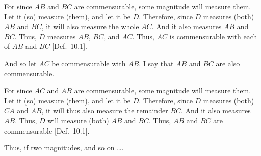 \begin{Parallel}{}{}
{For since $AB$ and $BC$ are commensurable, some  magnitude will
measure them. Let it (so) measure (them), and let it be $D$. Therefore,
since $D$ measures (both) $AB$ and $BC$, it will also measure the
whole $AC$. And it also measures $AB$ and $BC$. Thus, $D$
measures  $AB$, $BC$, and $AC$. Thus, $AC$ is commensurable
with each of $AB$ and $BC$ [Def.~10.1].

And so let $AC$ be commensurable with $AB$. I say that $AB$ and
$BC$ are also commensurable.

For since $AC$ and $AB$ are commensurable, some  magnitude
will measure them. Let it (so) measure (them), and let it be $D$. Therefore,
since $D$ measures (both) $CA$ and $AB$, it will thus also
measure the remainder $BC$. And it also measures $AB$. Thus, $D$ will
measure (both) $AB$ and $BC$. Thus, $AB$ and $BC$ are commensurable [Def.~10.1].

Thus, if two magnitudes, and so on \ldots.}
\end{Parallel}

